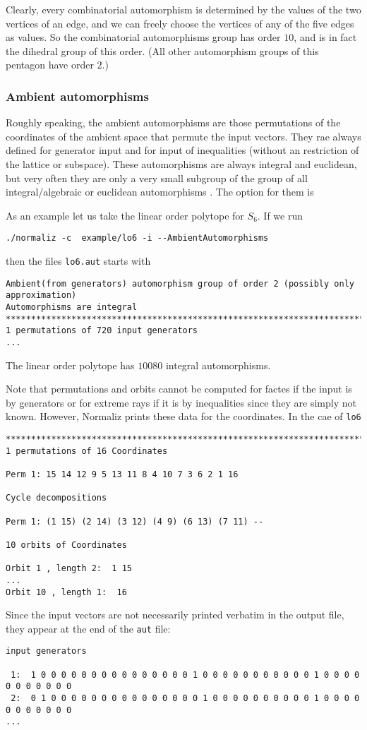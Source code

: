 Clearly, every combinatorial automorphism is determined by the values of the two vertices of an edge, and we can freely choose the vertices of any of the five edges as values. So the combinatorial automorphisms group has order $10$, and is in fact the dihedral group of this order. (All other automorphism groups of this pentagon have order $2$.)

\subsubsection{Ambient automorphisms}

Roughly speaking, the ambient automorphisms are those permutations of the coordinates of the ambient space that permute the input vectors. They rae always defined for generator input and for input of inequalities (without an restriction of the lattice or subspace). These automorphisms are always integral and euclidean, but very often they are only a very small subgroup of the group of all integral/algebraic or euclidean automorphisms . The option for them is
\begin{itemize}
	\itemtt[AmbientAutomorphisms]
\end{itemize}
As an example let us take the linear order polytope for $S_6$. If we run
\begin{Verbatim}
./normaliz -c  example/lo6 -i --AmbientAutomorphisms
\end{Verbatim}
then the files \verb|lo6.aut| starts with 
\begin{Verbatim}
Ambient(from generators) automorphism group of order 2 (possibly only approximation)
Automorphisms are integral
************************************************************************
1 permutations of 720 input generators
...
\end{Verbatim}
The linear order polytope  has $10080$ integral automorphisms.

Note that permutations and orbits cannot be computed for factes if the input is by generators or for extreme rays if it is by inequalities since they are simply not known. However, Normaliz prints these data for the coordinates. In the cae  of \verb|lo6|
\begin{Verbatim}
************************************************************************
1 permutations of 16 Coordinates

Perm 1: 15 14 12 9 5 13 11 8 4 10 7 3 6 2 1 16

Cycle decompositions 

Perm 1: (1 15) (2 14) (3 12) (4 9) (6 13) (7 11) --

10 orbits of Coordinates

Orbit 1 , length 2:  1 15
...
Orbit 10 , length 1:  16
\end{Verbatim}
Since the input vectors  are not necessarily printed verbatim in the output file, they appear at the end of the \verb|aut| file:
\begin{Verbatim}
input generators

 1:  1 0 0 0 0 0 0 0 0 0 0 0 0 0 0 0 1 0 0 0 0 0 0 0 0 0 0 0 1 0 0 0 0 0 0 0 0 0 0 0
 2:  0 1 0 0 0 0 0 0 0 0 0 0 0 0 0 0 0 1 0 0 0 0 0 0 0 0 0 0 1 0 0 0 0 0 0 0 0 0 0 0
...
\end{Verbatim}

